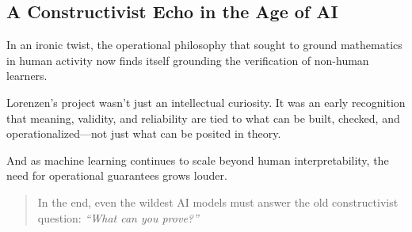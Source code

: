 \vspace{1em}

\subsection{A Constructivist Echo in the Age of AI}

In an ironic twist, the operational philosophy that sought to ground mathematics in human activity now finds itself grounding the verification of non-human learners.

Lorenzen’s project wasn’t just an intellectual curiosity. It was an early recognition that meaning, validity, and reliability are tied to what can be built, checked, and operationalized—not just what can be posited in theory.

And as machine learning continues to scale beyond human interpretability, the need for operational guarantees grows louder.

\begin{quote}
In the end, even the wildest AI models must answer the old constructivist question:  
\emph{“What can you prove?”}
\end{quote}
